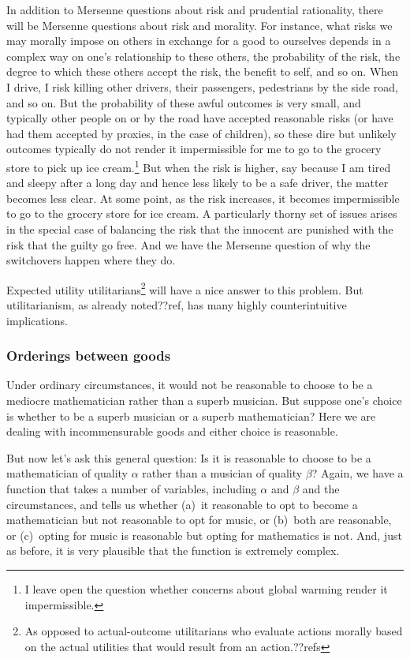 In addition to Mersenne questions about risk and prudential rationality, there will be Mersenne questions about risk and morality.
For instance, what risks we may morally impose on others in exchange for a good to ourselves depends in a complex way 
on one's relationship to these others, the probability of the risk, the degree to which these others accept the risk, the 
benefit to self, and so on. When I drive, I risk killing other drivers, their passengers, pedestrians by the side road, and so on.
But the probability of these awful outcomes is very small, and typically other people on or by the road have accepted reasonable
risks (or have had them accepted by proxies, in the case of children), so these dire but unlikely outcomes typically do not render it impermissible for
me to go to the grocery store to pick up ice cream.\footnote{I leave open the question whether concerns about global warming 
render it impermissible.} But when the risk is higher, say because I am tired and sleepy after a long day and hence less likely to be
a safe driver, the matter becomes less clear. At some point, as the risk increases, it becomes impermissible to go to the grocery
store for ice cream. 
A particularly thorny set of issues arises in the special case of balancing the risk that the innocent are punished with the risk that the guilty go free.
And we have the Mersenne question of why the switchovers happen where they do.

Expected utility utilitarians\footnote{As opposed to actual-outcome utilitarians who evaluate actions morally based on the
actual utilities that would result from an action.??refs} will have a nice answer to this problem. But utilitarianism, as already
noted??ref, has many highly counterintuitive implications. 

\subsubsection{Orderings between goods}
Under ordinary circumstances, it would not be reasonable to choose to be a mediocre mathematician rather than a superb musician. 
But suppose one's choice is whether to be a superb
musician or a superb mathematician? Here we are dealing with incommensurable goods and either choice is reasonable.

But now let's ask this general question: Is it is reasonable to choose to be a mathematician of quality $\alpha$ rather than
a musician of quality $\beta$? Again, we have a function that takes a number of variables, including $\alpha$ and $\beta$
and the circumstances, and tells us whether (a)~it reasonable to opt to become a mathematician but not reasonable to opt for
music, or (b)~both are reasonable, or (c)~opting for music is reasonable but opting for mathematics is not. And, just as before,
it is very plausible that the function is extremely complex.

